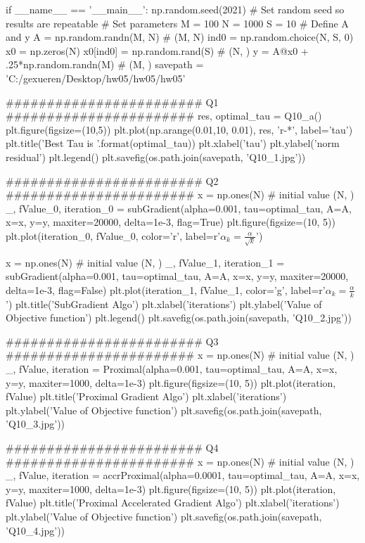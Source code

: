 \documentclass[12pt, a4 paper]{article}
\begin{document}
\begin{framed}
\begin{python}
if __name__ == '__main__':
    np.random.seed(2021) # Set random seed so results are repeatable # Set parameters
    M = 100
    N = 1000
    S = 10
    # Define A and y
    A = np.random.randn(M, N) # (M, N)
    ind0 = np.random.choice(N, S, 0)
    x0 = np.zeros(N)
    x0[ind0] = np.random.rand(S) # (N, )
    y = A@x0 + .25*np.random.randn(M) # (M, )
    savepath = 'C:/gexueren/Desktop/hw05/hw05/hw05'
    
    ######################## Q1 #######################
    res, optimal_tau = Q10_a()
    plt.figure(figsize=(10,5))
    plt.plot(np.arange(0.01,10, 0.01), res, 'r-*', label='tau')
    plt.title('Best Tau is {}'.format(optimal_tau))
    plt.xlabel('tau')
    plt.ylabel('norm residual')
    plt.legend()
    plt.savefig(os.path.join(savepath, 'Q10_1.jpg'))

    ######################## Q2 #######################
    x = np.ones(N) # initial value (N, )
    _, fValue_0, iteration_0 = subGradient(alpha=0.001, tau=optimal_tau, A=A, x=x, y=y, maxiter=20000, delta=1e-3, flag=True)
    plt.figure(figsize=(10, 5))
    plt.plot(iteration_0, fValue_0, color='r', label=r'$\alpha_{k}= \frac{\alpha}{\sqrt{k}}$')

    x = np.ones(N) # initial value (N, )
    _, fValue_1, iteration_1 = subGradient(alpha=0.001, tau=optimal_tau, A=A, x=x, y=y, maxiter=20000, delta=1e-3, flag=False)
    plt.plot(iteration_1, fValue_1, color='g', label=r'$\alpha_{k}= \frac{\alpha}{k}$')
    plt.title('SubGradient Algo')
    plt.xlabel('iterations')
    plt.ylabel('Value of Objective function')
    plt.legend()
    plt.savefig(os.path.join(savepath, 'Q10_2.jpg'))

    ######################## Q3 #######################
    x = np.ones(N) # initial value (N, )
    _, fValue, iteration = Proximal(alpha=0.001, tau=optimal_tau, A=A, x=x, y=y, maxiter=1000, delta=1e-3)
    plt.figure(figsize=(10, 5))
    plt.plot(iteration, fValue)
    plt.title('Proximal Gradient Algo')
    plt.xlabel('iterations')
    plt.ylabel('Value of Objective function')
    plt.savefig(os.path.join(savepath, 'Q10_3.jpg'))

    ######################## Q4 #######################
    x = np.ones(N) # initial value (N, )
    _, fValue, iteration = accrProximal(alpha=0.0001, tau=optimal_tau, A=A, x=x, y=y, maxiter=1000, delta=1e-3)
    plt.figure(figsize=(10, 5))
    plt.plot(iteration, fValue)
    plt.title('Proximal Accelerated Gradient Algo')
    plt.xlabel('iterations')
    plt.ylabel('Value of Objective function')
    plt.savefig(os.path.join(savepath, 'Q10_4.jpg'))
        \end{python}
    \end{framed}
\end{document}
